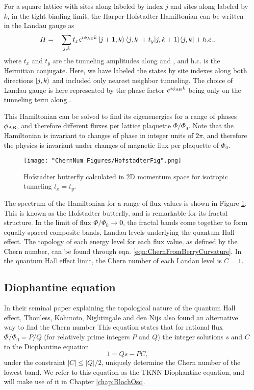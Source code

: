 For a square lattice with sites along \ex{} labeled by index $j$ and sites along \ey{} labeled by $k$, in the tight binding limit, the Harper-Hofstadter Hamiltonian can be written in the Landau gauge as
\begin{equation}
H=-\sum_{j,k} t_x e^{i\phi_{\rm AB}k}\mathinner{|{j+1,k}\rangle}\mathinner{\langle{j,k}|}+t_y|j,k+1\rangle\langle j,k| +  h.c.,
\label{eqn:hofstadterHam}
\end{equation} 
where $t_x$ and $t_y$ are the tunneling amplitudes along \ex{} and \ey{}, and h.c. is the Hermitian conjugate. Here, we have labeled the states by site indexes along both directions $\mathinner{|{j,k}\rangle}$ and included only nearest neighbor tunneling. The choice of Landau gauge is here represented by the phase factor $e^{i\phi_{\rm AB}k}$ being only on the tunneling term along \ex{}.

This Hamiltonian can be solved to find its eigenenergies for a range of phases  $\phi_{\rm AB}$, and therefore different fluxes per lattice plaquette $\Phi/\Phi_0$. Note that the Hamiltonian is invariant to changes of phase in integer units of $2\pi$, and therefore the physics is invariant under changes of magnetic flux per plaquette of $\Phi_0$. 

\begin{figure}
	\texttt{[image: "ChernNum Figures/HofstadterFig".png]}
\label{fig:Hofstadter}
\caption[Hofstadter butterfly]{Hofstadter butterfly calculated in 2D momentum space for isotropic tunneling $t_x=t_y$.}
\end{figure}
The spectrum of the Hamiltonian for a range of flux values is shown in Figure \ref{fig:Hofstadter}. This is known as the Hofstadter butterfly, and is remarkable for its fractal structure. In the limit of flux $\Phi/\Phi_0\rightarrow0$, the fractal bands come together to form equally spaced composite bands, Landau levels underlying the quantum Hall effect\cite{Ando1975,Klitzing1980,Laughlin1981}. The topology of each energy level for each flux value, as defined by the Chern number, can be found through eqn. \ref{eqn:ChernFromBerryCurvature}. In the quantum Hall effect limit, the Chern number of each Landau level is $C=1$.

\subsection{Diophantine equation} \label{sec:DiophantineIntro}	
In their seminal paper explaining the topological nature of the quantum Hall effect\cite{Thouless1982}, Thouless, Kohmoto, Nightingale and den Nijs also found an alternative way to find the Chern number 
This equation states that for rational flux $\Phi/\Phi_0 = P/Q$ (for relatively prime integers $P$ and $Q$) the integer solutions  $s$ and $C$ to the Diophantine equation
\begin{equation}
1 = Q s - P C,
\label{eqn:Diophantine}
\end{equation}  
under the constraint $|C|\leq |Q|/2$\cite{Thouless1982, Kohmoto1989}, uniquely determine the Chern number of the lowest band. We refer to this equation as the TKNN Diophantine equation, and will make use of it in Chapter \ref{chap:BlochOsc}. 

